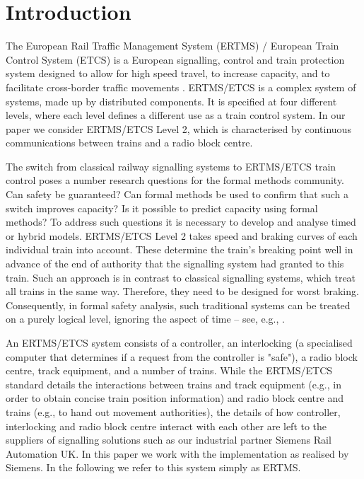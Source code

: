 \section{Introduction}



The European Rail Traffic Management System (ERTMS) / European Train
Control System (ETCS) is a European signalling, control and train
protection system designed to allow for high speed travel, to increase
capacity, and to facilitate cross-border traffic movements
\cite{ERTMS}. ERTMS/ETCS is a complex system of systems, made up by
distributed components. It is specified at four different levels,
where each level defines a different use as a train control system. In
our paper we consider ERTMS/ETCS Level 2, which is characterised by
continuous communications between trains and a radio block centre.

The switch from classical railway signalling systems to ERTMS/ETCS
train control poses a number research questions for the formal methods
community. Can safety be guaranteed? Can formal methods be used to
confirm that such a switch improves capacity? Is it possible to
predict capacity using formal methods? To address such questions it is
necessary to develop and analyse timed or hybrid models. ERTMS/ETCS
Level 2 takes speed and braking curves of each individual train into
account. These determine the train's breaking point well in advance of
the end of authority that the signalling system had granted to this
train. Such an approach is in contrast to classical signalling
systems, which treat all trains in the same way. Therefore, they need
to be designed for worst braking. Consequently, in
formal safety analysis, such traditional systems can be treated on a purely
logical level, ignoring the aspect of time -- see, e.g.,
\cite{sttt14,JamesMNRST14}.

An ERTMS/ETCS system consists of a controller, an interlocking (a
specialised computer that determines if a request from the controller
is "safe"), a radio block centre, track equipment, and a number of
trains. While the {ERTMS/}{ETCS} standard details the interactions between
trains and track equipment (e.g., in order to obtain concise train
position information) and radio block centre and trains (e.g., to hand
out movement authorities), the details of how controller, interlocking
and radio block centre interact with each other are left to the
suppliers of signalling solutions such as our industrial partner
Siemens Rail Automation UK. In this paper we work with
the implementation as realised by Siemens. In the following we refer
to this system simply as ERTMS.

